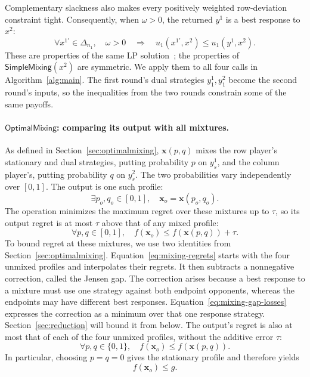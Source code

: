 \documentclass[11pt]{article}
\theoremstyle{remark}
\theoremstyle{plain}
\newcommand{\sm}{\mathsf{SimpleMixing}}
\newcommand{\om}{\mathsf{OptimalMixing}}
\begin{document}
Complementary slackness also makes every positively weighted
row-deviation constraint tight. Consequently, when $\omega>0$, the returned $y^1$ is a best
response to $x^2$:
\begin{equation}
 \forall x^{1\prime}\in\Delta_{n_1},\quad
 \omega>0\quad\Longrightarrow\quad
 u_1(x^{1\prime},x^2)\le u_1(y^1,x^2).
 \label{eq:properties-sm-br}
\end{equation}
These are properties of the same LP solution~\cite{automating2025,boyd2004};
the properties of $\sm(x^2)$ are symmetric. We apply them to all
four calls in Algorithm~\ref{alg:main}. The first round's dual
strategies $y_1^1,y_1^2$ become the second round's inputs, so the
inequalities from the two rounds constrain some of the same payoffs.

\paragraph{\texorpdfstring{$\om$}{OptimalMixing}: comparing its output with all mixtures.}
As defined in Section~\ref{sec:optimalmixing},
$\boldsymbol{x}(p,q)$ mixes the row player's stationary and dual
strategies, putting probability $p$ on $y_s^1$, and the column
player's, putting probability $q$ on $y_s^2$. The two probabilities
vary independently over $[0,1]$. The
output is one such profile:
\[
 \exists p_o,q_o\in[0,1],\quad
 \boldsymbol{x}_o=\boldsymbol{x}(p_o,q_o).
\]
The operation minimizes the maximum regret over these mixtures up
to $\tau$, so its output regret is at most $\tau$ above that of any
mixed profile:
\begin{equation}
 \forall p,q\in[0,1],\quad
 f(\boldsymbol{x}_o)\le f(\boldsymbol{x}(p,q))+\tau.
 \label{eq:om}
\end{equation}
To bound regret at these mixtures, we use two identities from
Section~\ref{sec:optimalmixing}. Equation~\eqref{eq:mixing-regrets}
starts with the four unmixed profiles and interpolates their regrets.
It then subtracts a nonnegative correction, called the Jensen gap.
The correction arises because a best response to a mixture must
use one strategy against both endpoint opponents, whereas the
endpoints may have different best responses. Equation~\eqref{eq:mixing-gap-losses}
expresses the correction as a minimum over that one response
strategy. Section~\ref{sec:reduction} will bound it from below. The
output's regret is also at most that of each of the four unmixed
profiles, without the additive error $\tau$:
\[
 \forall p,q\in\{0,1\},\quad
 f(\boldsymbol{x}_o)\le f(\boldsymbol{x}(p,q)).
\]
In particular, choosing $p=q=0$ gives the stationary profile and
therefore yields
\begin{equation}
 f(\boldsymbol{x}_o)\le g.
 \label{eq:properties-om-g}
\end{equation}
\end{document}

